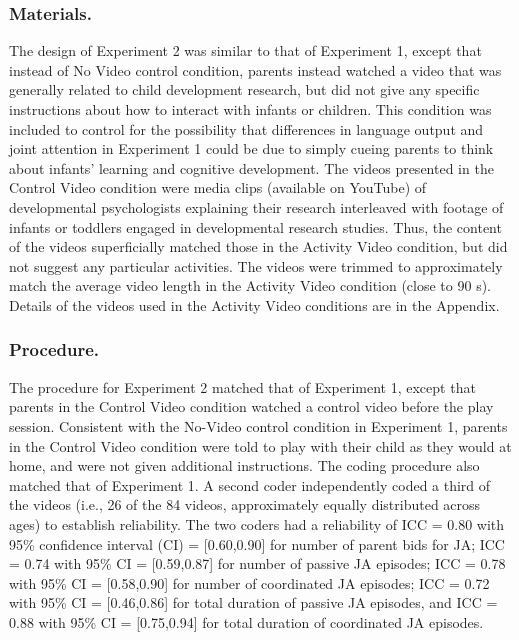 \documentclass[man,floatsintext]{apa6}
\begin{document}
\hypertarget{materials.-1}{%
\subsubsection{Materials.}\label{materials.-1}}

The design of Experiment 2 was similar to that of Experiment 1, except that instead of No Video control condition, parents instead watched a video that was generally related to child development research, but did not give any specific instructions about how to interact with infants or children.
This condition was included to control for the possibility that differences in language output and joint attention in Experiment 1 could be due to simply cueing parents to think about infants' learning and cognitive development.
The videos presented in the Control Video condition were media clips (available on YouTube) of developmental psychologists explaining their research interleaved with footage of infants or toddlers engaged in developmental research studies.
Thus, the content of the videos superficially matched those in the Activity Video condition, but did not suggest any particular activities.
The videos were trimmed to approximately match the average video length in the Activity Video condition (close to 90 s).
Details of the videos used in the Activity Video conditions are in the Appendix.

\hypertarget{procedure.-1}{%
\subsubsection{Procedure.}\label{procedure.-1}}

The procedure for Experiment 2 matched that of Experiment 1, except that parents in the Control Video condition watched a control video before the play session.
Consistent with the No-Video control condition in Experiment 1, parents in the Control Video condition were told to play with their child as they would at home, and were not given additional instructions.
The coding procedure also matched that of Experiment 1.
A second coder independently coded a third of the videos (i.e., 26 of the 84 videos, approximately equally distributed across ages) to establish reliability.
The two coders had a reliability of ICC = 0.80 with 95\% confidence interval (CI) = {[}0.60,0.90{]} for number of parent bids for JA; ICC = 0.74 with 95\% CI = {[}0.59,0.87{]} for number of passive JA episodes; ICC = 0.78 with 95\% CI = {[}0.58,0.90{]} for number of coordinated JA episodes; ICC = 0.72 with 95\% CI = {[}0.46,0.86{]} for total duration of passive JA episodes, and ICC = 0.88 with 95\% CI = {[}0.75,0.94{]} for total duration of coordinated JA episodes.
\end{document}
